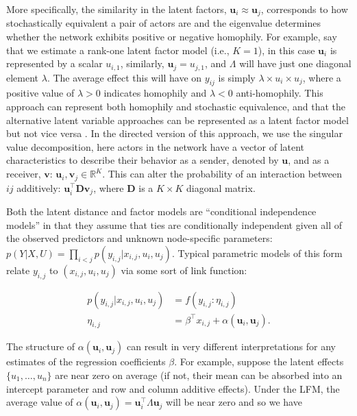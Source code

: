 \documentclass[12pt,twocolumn,twoside]{pnas-new}
\begin{document}
More specifically, the similarity in the latent factors, $\textbf{u}_{i} \approx \textbf{u}_{j}$, corresponds to how stochastically equivalent a pair of actors are and the eigenvalue determines whether the network exhibits positive or negative homophily. For example, say that we estimate a rank-one latent factor model (i.e., $K=1$), in this case $\textbf{u}_{i}$ is represented by a scalar $u_{i,1}$, similarly, $\textbf{u}_{j}=u_{j,1}$, and $\Lambda$ will have just one diagonal element $\lambda$. The average effect this will have on $y_{ij}$ is simply $\lambda \times u_{i} \times u_{j}$, where a positive value of $\lambda>0$ indicates homophily and $\lambda<0$ anti-homophily. This approach can represent both homophily and stochastic equivalence, and that the alternative latent variable approaches can be represented as a latent factor model but not vice versa \cite{hoff:2008}. In the directed version of this approach, we use the singular value decomposition, here actors in the network have a vector of latent characteristics to describe their behavior as a sender, denoted by $\textbf{u}$, and as a receiver, $\textbf{v}$: $\textbf{u}_{i}, \textbf{v}_{j} \in \mathbb{R}^{K}$. This can alter the probability of an interaction between $ij$ additively: $\textbf{u}_{i}^{\top} \textbf{D} \textbf{v}_{j}$, where $\textbf{D}$ is a $K \times K$ diagonal matrix.

Both the latent distance and factor models are ``conditional independence models'' in that they assume that ties are conditionally independent given all of the observed predictors and unknown node-specific parameters: $p( Y | X , U ) = \prod_{i<j} p( y_{i,j}  | x_{i,j} , u_i , u_j)$. Typical parametric models of this form relate $y_{i,j}$ to $(x_{i,j},u_i,u_j)$ via some sort of link function:

\begin{align*}
	p(y_{i,j} | x_{i,j}, u_i , u_j ) & = f( y_{i,j} : \eta_{i,j} ) \\
	\eta_{i,j} &= \beta^\top x_{i,j} + \alpha(\textbf{u}_{i}, \textbf{u}_{j}).
\end{align*}

The structure of $\alpha(\textbf{u}_{i}, \textbf{u}_{j})$ can result in very different interpretations for any estimates of the regression coefficients $\beta$. For example, suppose the latent effects $\{ u_1,\ldots, u_n\}$ are near zero on average (if not, their mean can be absorbed into an intercept parameter and row and column additive effects). Under the LFM, the average value of $\alpha(\textbf{u}_{i}, \textbf{u}_{j}) = \textbf{u}_{i}^{\top} \Lambda \textbf{u}_{j}$ will be near zero and so we have
\end{document}
